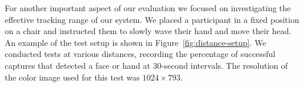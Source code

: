 \begin{invisBox}
    \hfill
\end{invisBox}


For another important aspect of our evaluation we focused on investigating the effective tracking range of our system. We placed a participant in a fixed position on a chair and instructed them to slowly wave their hand and move their head. An example of the test setup is shown in Figure~\ref{fig:distance-setup}. We conducted tests at various distances, recording the percentage of successful captures that detected a face or hand at 30-second intervals. The resolution of the color image used for this test was $1024 \times 793$.

